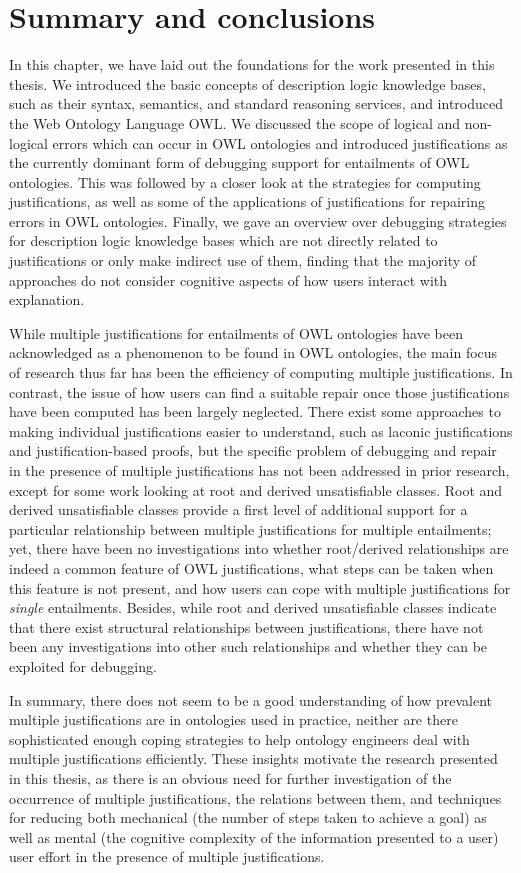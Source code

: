 \section{Summary and conclusions}
In this chapter, we have laid out the foundations for the work presented in this thesis. We introduced the basic concepts of description logic knowledge bases, such as their syntax, semantics, and standard reasoning services, and introduced the Web Ontology Language OWL. We discussed the scope of logical and non-logical errors which can occur in OWL ontologies and introduced justifications as the currently dominant form of debugging support for entailments of OWL ontologies. This was followed by a closer look at the strategies for computing justifications, as well as some of the applications of justifications for repairing errors in OWL ontologies. Finally, we gave an overview over debugging strategies for description logic knowledge bases which are not directly related to justifications or only make indirect use of them, finding that the majority of approaches do not consider cognitive aspects of how users interact with explanation.

While multiple justifications for entailments of OWL ontologies have been acknowledged as a phenomenon to be found in OWL ontologies, the main focus of research thus far has been the efficiency of computing multiple justifications. In contrast, the issue of how users can find a suitable repair once those justifications have been computed has been largely neglected. There exist some approaches to making individual justifications easier to understand, such as laconic justifications and justification-based proofs, but the specific problem of debugging and repair in the presence of multiple justifications has not been addressed in prior research, except for some work looking at root and derived unsatisfiable classes. Root and derived unsatisfiable classes provide a first level of additional support for a particular relationship between multiple justifications for multiple entailments; yet, there have been no investigations into whether root/derived relationships are indeed a common feature of OWL justifications, what steps can be taken when this feature is not present, and how users can cope with multiple justifications for \emph{single} entailments. Besides, while root and derived unsatisfiable classes indicate that there exist structural relationships between justifications, there have not been any investigations into other such relationships and whether they can be exploited for debugging.

In summary, there does not seem to be a good understanding of how prevalent multiple justifications are in ontologies used in practice, neither are there sophisticated enough coping strategies to help ontology engineers deal with multiple justifications efficiently. These insights motivate the research presented in this thesis, as there is an obvious need for further investigation of the occurrence of multiple justifications, the relations between them, and techniques for reducing both mechanical (the number of steps taken to achieve a goal) as well as mental (the cognitive complexity of the information presented to a user) user effort in the presence of multiple justifications.